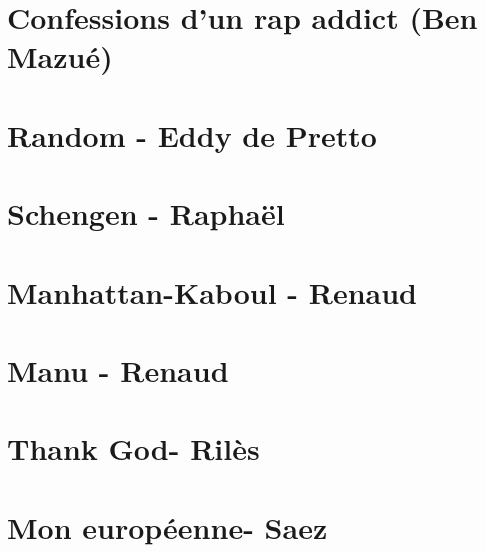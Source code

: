 \documentclass{guitartabs}
\begin{document}
\section{Confessions d'un rap addict (Ben Mazué)}
\begin{guitar}

\end{guitar}

\section{Random - Eddy de Pretto}
\begin{guitar}

\end{guitar}


\section{Schengen - Raphaël}
\begin{guitar}

\end{guitar}

\section{Manhattan-Kaboul - Renaud}
\begin{guitar}

\end{guitar}

\section{Manu - Renaud}
\begin{guitar}

\end{guitar}

\section{Thank God- Rilès}
\begin{guitar}

\end{guitar}

\section{Mon européenne- Saez}
\begin{guitar}

\end{guitar}
\end{document}
